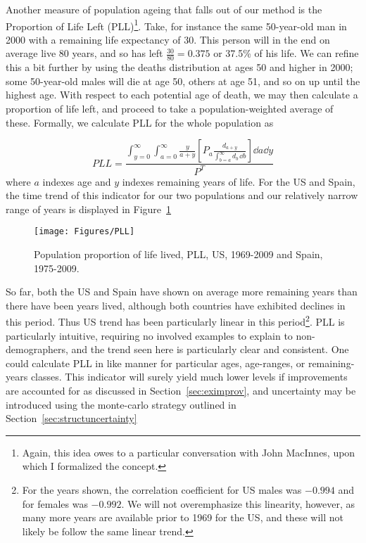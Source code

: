 Another measure of population ageing that falls out of our method is the
Proportion of Life Left (PLL)\footnote{Again, this idea owes to a
particular conversation with John MacInnes, upon which I formalized the
concept.}. Take, for instance the same 50-year-old man in 2000 with a remaining life expectancy of
30. This person will in the end on average live 80 years, and so has left
$\tfrac{30}{80} = 0.375$ or 37.5\% of his life. We can refine this a bit further
by using the deaths distribution at ages 50 and higher in 2000; some 50-year-old
males will die at age 50, others at age 51, and so on up until the highest age.
With respect to each potential age of death, we may then calculate a proportion
of life left, and proceed to take a population-weighted average of these.
Formally, we calculate PLL for the whole population as

\begin{equation}
PLL = \frac{\int _{y = 0} ^\infty \int _{a = 0} ^\infty \frac{y}{a + y}
\left[ P_a
\frac{d_{a + y} }{ \int _{b = a} ^{\infty} d_b\, \dd b  }\right] \dd a \dd y }{
P^T }
\end{equation}
where $a$ indexes age and $y$ indexes remaining years of life. For the US and
Spain, the time trend of this indicator for our two populations and our
relatively narrow range of years is displayed in Figure~\ref{fig:PLL}
\begin{figure}
      \centering
      \caption{Population proportion of life lived, PLL, US, 1969-2009 and
      Spain, 1975-2009.}
         \texttt{[image: Figures/PLL]}
      \label{fig:PLL} 
\end{figure}

So far, both the US and Spain have shown on average more remaining years than
there have been years lived, although both countries have exhibited declines in
this period. Thus US trend has been particularly linear in this
period\footnote{For the years shown, the correlation coefficient for US males
was $-0.994$ and for females was $-0.992$. We will not overemphasize this
linearity, however, as many more years are available prior to 1969 for the US,
and these will not likely be follow the same linear trend.}. PLL is particularly
intuitive, requiring no involved examples to explain to non-demographers, and the trend seen here is particularly clear and consistent. One could calculate PLL in like manner for particular ages, age-ranges, or remaining-years classes. This indicator will surely yield much lower levels if improvements are accounted for as discussed in Section~\ref{sec:eximprov}, and uncertainty may be introduced using the monte-carlo strategy outlined in Section~\ref{sec:structuncertainty}

